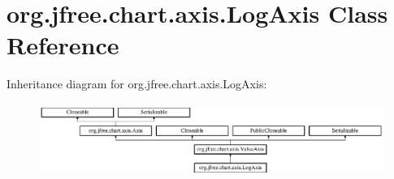 \hypertarget{classorg_1_1jfree_1_1chart_1_1axis_1_1_log_axis}{}\section{org.\+jfree.\+chart.\+axis.\+Log\+Axis Class Reference}
\label{classorg_1_1jfree_1_1chart_1_1axis_1_1_log_axis}
Inheritance diagram for org.\+jfree.\+chart.\+axis.\+Log\+Axis\+:\begin{figure}[H]
\begin{center}
\leavevmode
\includegraphics[height=2.370370cm]{classorg_1_1jfree_1_1chart_1_1axis_1_1_log_axis}
\end{center}
\end{figure}
